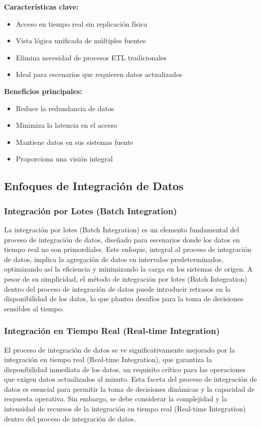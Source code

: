 \documentclass[12pt]{book}
\begin{document}
\textbf{Características clave:}
\begin{itemize}
    \item Acceso en tiempo real sin replicación física
    \item Vista lógica unificada de múltiples fuentes
    \item Elimina necesidad de procesos ETL tradicionales
    \item Ideal para escenarios que requieren datos actualizados
\end{itemize}

\textbf{Beneficios principales:}
\begin{itemize}
    \item Reduce la redundancia de datos
    \item Minimiza la latencia en el acceso
    \item Mantiene datos en sus sistemas fuente
    \item Proporciona una visión integral
\end{itemize}

\subsection{Enfoques de Integración de Datos}
\subsubsection{Integración por Lotes (Batch Integration)}
La integración por lotes (Batch Integration) es un elemento fundamental del proceso de integración de datos, diseñado para escenarios donde los datos en tiempo real no son primordiales. Este enfoque, integral al proceso de integración de datos, implica la agregación de datos en intervalos predeterminados, optimizando así la eficiencia y minimizando la carga en los sistemas de origen. A pesar de su simplicidad, el método de integración por lotes (Batch Integration) dentro del proceso de integración de datos puede introducir retrasos en la disponibilidad de los datos, lo que plantea desafíos para la toma de decisiones sensibles al tiempo.

\subsubsection{Integración en Tiempo Real (Real-time Integration)}
El proceso de integración de datos se ve significativamente mejorado por la integración en tiempo real (Real-time Integration), que garantiza la disponibilidad inmediata de los datos, un requisito crítico para las operaciones que exigen datos actualizados al minuto. Esta faceta del proceso de integración de datos es esencial para permitir la toma de decisiones dinámicas y la capacidad de respuesta operativa. Sin embargo, se debe considerar la complejidad y la intensidad de recursos de la integración en tiempo real (Real-time Integration) dentro del proceso de integración de datos.
\end{document}
